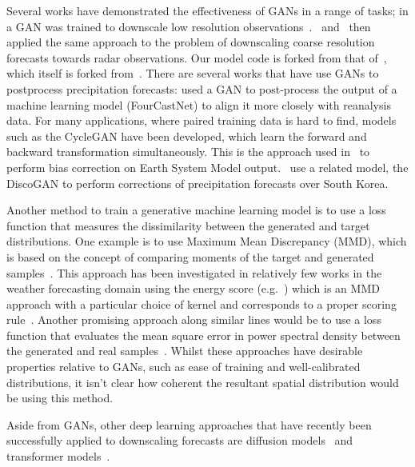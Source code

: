 \documentclass{article}
\begin{document}
Several works have demonstrated the effectiveness of GANs in a range of tasks; in \cite{leinonen_stochastic_2020} a GAN was trained to downscale low resolution observations~\citep{leinonen_stochastic_2020}.~\cite{harris_generative_2022} and~\cite{price_increasing_2022} then applied the same approach to the problem of downscaling coarse resolution forecasts towards radar observations. Our model code is forked from that of~\cite{harris_generative_2022}, which itself is forked from~\cite{leinonen_stochastic_2020}. There are several works that have use GANs to postprocess precipitation forecasts: \cite{duncan_generative_2022} used a GAN to post-process the output of a machine learning model (FourCastNet) to align it more closely with reanalysis data. For many applications, where paired training data is hard to find, models such as the CycleGAN have been developed, which learn the forward and backward transformation simultaneously. This is the approach used in~\cite{hess_physically_2022} to perform bias correction on Earth System Model output.~\cite{jeong_correcting_2023} use a related model, the DiscoGAN to perform corrections of precipitation forecasts over South Korea. 

Another method to train a generative machine learning model is to use a loss function that measures the dissimilarity between the generated and target distributions. One example is to use Maximum Mean Discrepancy (MMD), which is based on the concept of comparing moments of the target and generated samples~\citep{li_generative_2015, dziugaite_training_2015}. This approach has been investigated in relatively few works in the weather forecasting domain using the energy score (e.g.~\cite{pacchiardi_probabilistic_2021}) which is an MMD approach with a particular choice of kernel and corresponds to a proper scoring rule~\citep{gneiting_strictly_2007}. Another promising approach along similar lines would be to use a loss function that evaluates the mean square error in power spectral density between the generated and real samples~\citep{singh_numerical_2019}. Whilst these approaches have desirable properties relative to GANs, such as ease of training and well-calibrated distributions, it isn't clear how coherent the resultant spatial distribution would be using this method. 

Aside from GANs, other deep learning approaches that have recently been successfully applied to downscaling forecasts are diffusion models~\citep{li_seeds_2023, addison_machine_2022, leinonen_latent_2023} and transformer models~\citep{ben-bouallegue_improving_2023}. 
\end{document}
